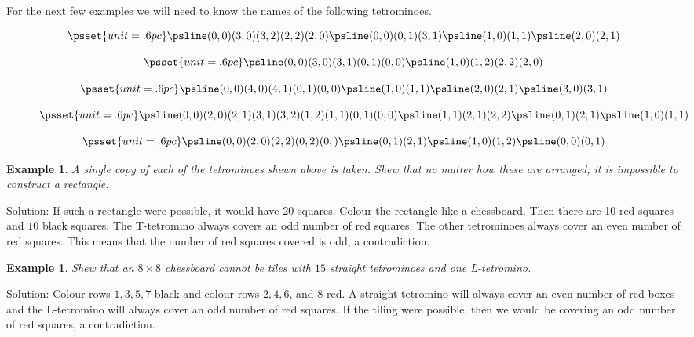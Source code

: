 \documentclass[11pt, openany]{book}
\theoremstyle{change} \theoremheaderfont{\blue\sffamily\bfseries}
\newtheorem{exa}[thm]{Example}
\theoremstyle{nonumberplain} \theoremheaderfont{\sffamily\bfseries}
\newcommand{\í}{\'{\i}}
\begin{document}
\clearpage

For the next few examples we will need to know the names of the
following tetrominoes. \vspace{1cm}

\begin{figure}[h]
\begin{minipage}{5cm}
$$\psset{unit=.6pc} \psline(0,0)(3,0)(3,2)(2,2)(2,0)
\psline(0,0)(0,1)(3,1) \psline(1,0)(1,1) \psline(2,0)(2,1)
 $$
\end{minipage}
\hfill
\begin{minipage}{5cm}
$$ \psset{unit=.6pc} \psline(0,0)(3,0)(3,1)(0,1)(0,0)
\psline(1,0)(1,2)(2,2)(2,0)
 $$
\end{minipage}
\hfill
\begin{minipage}{5cm}
$$ \psset{unit=.6pc} \psline(0,0)(4,0)(4,1)(0,1)(0,0)
\psline(1,0)(1,1) \psline(2,0)(2,1) \psline(3,0)(3,1)
 $$
\end{minipage}
\end{figure}
\begin{figure}[h]	
\begin{minipage}{8cm}
$$ \psset{unit=.6pc}
\psline(0,0)(2,0)(2,1)(3,1)(3,2)(1,2)(1,1)(0,1)(0,0)
\psline(1,1)(2,1)(2,2) \psline(0,1)(2,1) \psline(1,0)(1,1)
  $$
\end{minipage}
\hfill
\begin{minipage}{8cm}
$$ \psset{unit=.6pc} \psline(0,0)(2,0)(2,2)(0,2)(0,) \psline(0,1)(2,1)
\psline(1,0)(1,2) \psline(0,0)(0,1)
  $$
\end{minipage}
\end{figure}
\begin{exa}
A single copy of each of the tetrominoes shewn above is taken.
Shew that no matter how these are arranged, it is impossible to
construct a rectangle.
\end{exa}
Solution: If such a rectangle were possible, it would have 20
squares. Colour the rectangle like a chessboard. Then there are 10
red squares and $10$ black squares. The T-tetromino always covers an
odd number of red squares. The other tetrominoes always cover an
even number of red squares. This means that the number of red
squares covered is odd, a contradiction.
\begin{exa}

Shew that an $8\times 8$ chessboard cannot be tiles with $15$
straight tetrominoes and one L-tetromino.

\end{exa}
Solution: Colour rows $1, 3, 5, 7$ black and colour rows $2, 4, 6$,
and $8$ red. A straight tetromino will always cover an even number
of red boxes and the L-tetromino will always cover an odd number of
red squares. If the tiling were possible, then we would be covering
an odd number of red squares, a contradiction.
\end{document}
